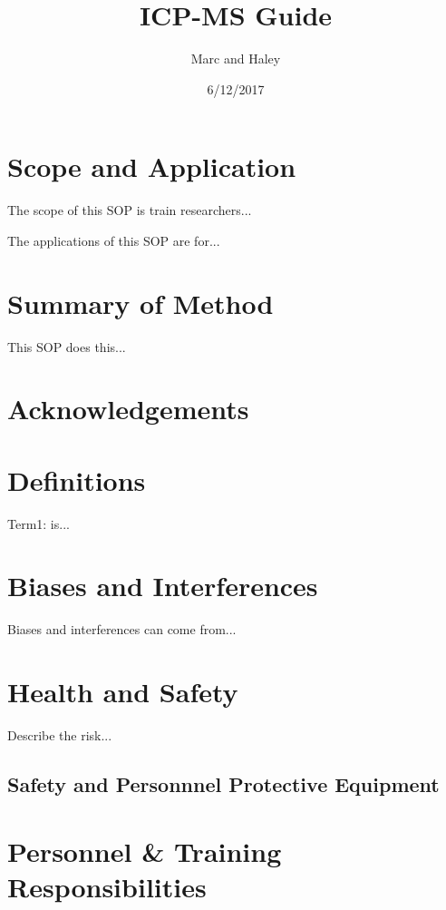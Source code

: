 \documentclass[12pt]{../SOP3_beta}
\title{ICP-MS Guide}
\date{6/12/2017}
\author{Marc and Haley}
\begin{document}


\maketitle

\section{Scope and Application}

\NP The scope of this SOP is train researchers...

\NP The applications of this SOP are for...

\section{Summary of Method}

\NP This SOP does this...

\tableofcontents

\newpage

\section{Acknowledgements}

\section{Definitions}

\NP Term1: is...

\section{Biases and Interferences}

\NP Biases and interferences can come from...

\section{Health and Safety}

\NP Describe the risk...


\subsection{Safety and Personnnel Protective Equipment}


\section{Personnel \& Training Responsibilities}
\end{document}
